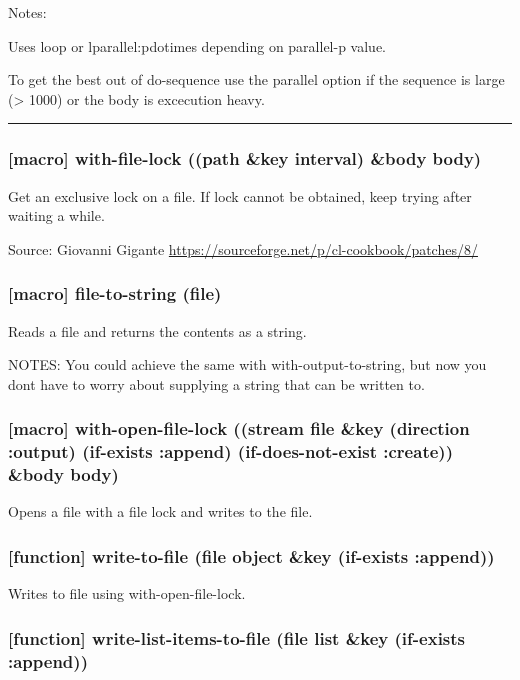 \documentclass[11pt]{article}
\begin{document}
Notes:

Uses loop or lparallel:pdotimes depending on parallel-p value.

To get the best out of do-sequence use the parallel option if the
sequence is large (> 1000) or the body is excecution heavy.

\noindent\rule{\textwidth}{0.5pt}

\subsubsection{[macro] with-file-lock ((path \&key interval) \&body body)}
\label{sec:org2cc4dcb}

Get an exclusive lock on a file. If lock cannot be obtained, keep
trying after waiting a while.

Source: Giovanni Gigante \url{https://sourceforge.net/p/cl-cookbook/patches/8/}

\subsubsection{[macro] file-to-string (file)}
\label{sec:org189c8ac}

Reads a file and returns the contents as a string.

NOTES: You could achieve the same with with-output-to-string, but now
you dont have to worry about supplying a string that can be written
to.

\subsubsection{[macro] with-open-file-lock ((stream file \&key (direction :output) (if-exists :append) (if-does-not-exist :create)) \&body body)}
\label{sec:org097e51f}

Opens a file with a file lock and writes to the file.

\subsubsection{[function] write-to-file (file object \&key (if-exists :append))}
\label{sec:orgc78fb3a}

Writes to file using with-open-file-lock.

\subsubsection{[function] write-list-items-to-file (file list \&key (if-exists :append))}
\label{sec:org8ea8af0}
\end{document}
